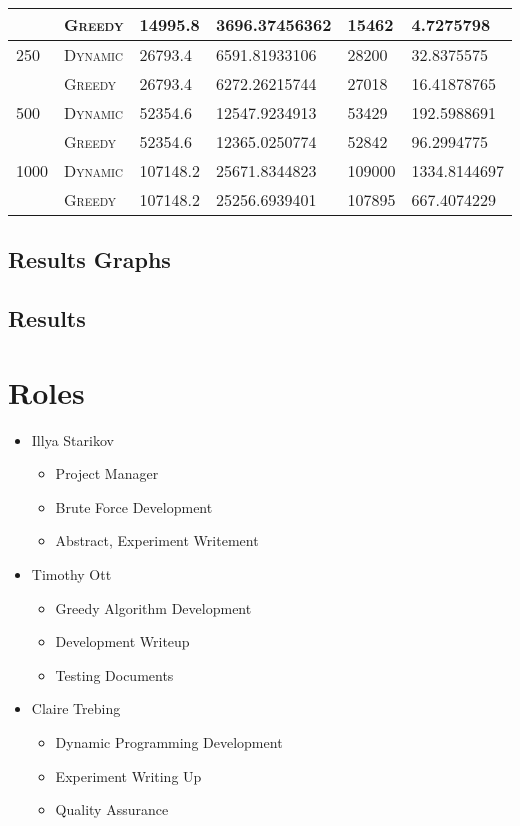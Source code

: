 \documentclass{article}
\begin{document}
\begin{adjustwidth}{-.5cm}{}
\begin{center}
\begin{tabular}{l|lllll}
        & \textsc{Greedy}  & 14995.8   & 3696.37456362    & 15462    &  4.7275798            \\ \midrule
250     & \textsc{Dynamic} & 26793.4   & 6591.81933106    & 28200    &  32.8375575           \\
        & \textsc{Greedy}  & 26793.4   & 6272.26215744    & 27018    &  16.41878765          \\ \midrule
500     & \textsc{Dynamic} & 52354.6   & 12547.9234913    & 53429    &  192.5988691          \\
        & \textsc{Greedy}  & 52354.6   & 12365.0250774    & 52842    &  96.2994775           \\ \midrule
1000    & \textsc{Dynamic} & 107148.2  & 25671.8344823    & 109000   &  1334.8144697         \\
        & \textsc{Greedy}  & 107148.2  & 25256.6939401    & 107895   &  667.4074229          \\
        \bottomrule
        \end{tabular}
    \end{center}
\end{adjustwidth}

\subsection{Results Graphs}


\subsection{Results}


\section{Roles}
\begin{itemize}
    \item Illya Starikov
    \begin{itemize}
        \item Project Manager
        \item Brute Force Development
        \item Abstract, Experiment Writement
    \end{itemize}
    \item Timothy Ott
    \begin{itemize}
        \item Greedy Algorithm Development
        \item Development Writeup
        \item Testing Documents
    \end{itemize}

    \item Claire Trebing
    \begin{itemize}
        \item Dynamic Programming Development
        \item Experiment Writing Up
        \item Quality Assurance
    \end{itemize}
\end{itemize}
\end{document}
